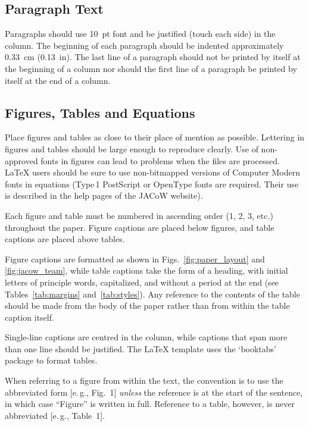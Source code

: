 \documentclass[a4paper,
               keeplastbox,   %
               ]{jacow}
\begin{document}
\subsection{Paragraph Text}

Paragraphs should use \SI{10}{pt} font and be justified (touch each side) in
the column. The beginning of each paragraph should be indented
approximately \SI{0.33}{cm} (\SI{0.13}{in}). The last line of a paragraph should not be
printed by itself at the beginning of a column nor should the first line of
a paragraph be printed by itself at the end of a column.

\subsection{Figures, Tables and Equations}

Place figures and tables as close to their place of mention as
possible. Lettering in figures and tables should be large enough to
reproduce clearly. Use of non-approved fonts in figures can lead to
problems when the files are processed. \LaTeX{} users should be sure to use
non-bitmapped versions of Computer Modern fonts in equations (Type\,1 PostScript
or OpenType fonts are required. Their use is described in the help 
pages of the JACoW website\cite{jacow-help}).

Each figure and table must be numbered in ascending
order (1, 2, 3, etc.) throughout the paper. 
Figure captions are placed below figures, and table
captions are placed above tables.

Figure captions are formatted as shown in Figs.~\ref{fig:paper_layout} and \ref{fig:jacow_team},
while table captions take the form of a heading,
with initial letters of principle words, capitalized, and
without a period at the end (see Tables~\ref{tab:margins} and~\ref{tab:styles}).
Any reference to the contents of the table should be made from
the body of the paper rather than from within the table
caption itself.

Single-line captions are centred in the column, while captions
that span more than one line should be justified.
The \LaTeX{} template uses the ‘booktabs’ package to
format tables. 

When referring to a figure from within the text, the
convention is to use the abbreviated form [e.\,g., Fig.~1]
\emph{unless} the reference is at the start of the sentence, in
which case “Figure” is written in full. Reference to a
table, however, is never abbreviated [e.\,g., Table~1].
\end{document}
